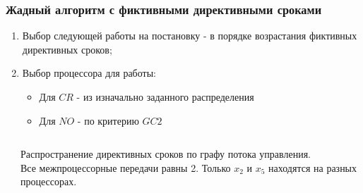 \begin{frame}
    \frametitle{Жадный алгоритм с фиктивными директивными сроками}
    \begin{enumerate}
        \item Выбор следующей работы на постановку - в порядке возрастания фиктивных директивных сроков;
        \item Выбор процессора для работы:
              \begin{itemize}
                  \item Для $CR$ - из изначально заданного распределения
                  \item Для $NO$ - по критерию $GC2$
              \end{itemize}
    \end{enumerate}
    \begin{columns}
        \begin{column}{0.5\textwidth}
        \end{column}
        \begin{column}{0.5\textwidth}
            Распространение директивных сроков по графу потока управления.\\Все межпроцессорные передачи равны 2. Только $x_2$ и $x_5$ находятся на разных процессорах.
        \end{column}
    \end{columns}
\end{frame}

